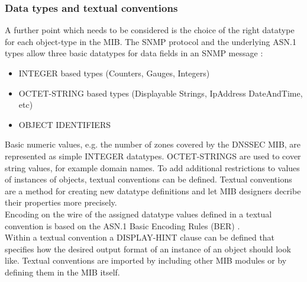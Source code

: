 \subsubsection{Data types and textual conventions}

A further point which needs to be considered is the choice of the right datatype for each object-type in the MIB. The SNMP protocol and the underlying ASN.1 types allow three basic datatypes for data fields in an SNMP message \cite{snmp-wire}:
\\
\begin{itemize}
\item
INTEGER based types (Counters, Gauges, Integers)
\item
OCTET-STRING based types (Displayable Strings, IpAddress DateAndTime, etc)
\item
OBJECT IDENTIFIERS
\end{itemize}

Basic numeric values, e.g. the number of zones covered by the DNSSEC MIB, are represented as simple INTEGER datatypes. OCTET-STRINGS are used to cover string values, for example domain names. To add additional restrictions to values of instances of objects, textual conventions can be defined. Textual conventions are a method for creating new datatype definitions and let MIB designers decribe their properties more precisely. 
\\
Encoding on the wire of the assigned datatype values defined in a textual convention is based on the ASN.1 Basic Encoding Rules (BER) \cite{ber-asn1}  \cite{snmp-wire}.
\\
Within a textual convention a DISPLAY-HINT clause can be defined that specifies how the desired output format of an instance of an object should look like. Textual conventions are imported by including other MIB modules \cite{smi-tc} or by defining them in the MIB itself. 

